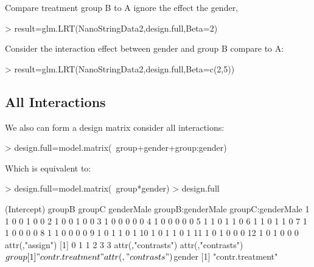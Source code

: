 \documentclass[12pt]{article}
\begin{document}
Compare treatment group B to A ignore the effect the gender, 
\begin{Schunk}
\begin{Sinput}
> result=glm.LRT(NanoStringData2,design.full,Beta=2)
\end{Sinput}
\end{Schunk}


Consider the interaction effect between gender and group B compare to A:
\begin{Schunk}
\begin{Sinput}
> result=glm.LRT(NanoStringData2,design.full,Beta=c(2,5))
\end{Sinput}
\end{Schunk}


\subsection{All Interactions}
We also can form a design matrix consider all interactions:
\begin{Schunk}
\begin{Sinput}
> design.full=model.matrix(~group+gender+group:gender)
\end{Sinput}
\end{Schunk}

Which is equivalent to:
\begin{Schunk}
\begin{Sinput}
> design.full=model.matrix(~group*gender)
> design.full
\end{Sinput}
\begin{Soutput}
   (Intercept) groupB groupC genderMale groupB:genderMale groupC:genderMale
1            1      0      0          1                 0                 0
2            1      0      0          1                 0                 0
3            1      0      0          0                 0                 0
4            1      0      0          0                 0                 0
5            1      1      0          1                 1                 0
6            1      1      0          1                 1                 0
7            1      1      0          0                 0                 0
8            1      1      0          0                 0                 0
9            1      0      1          1                 0                 1
10           1      0      1          1                 0                 1
11           1      0      1          0                 0                 0
12           1      0      1          0                 0                 0
attr(,"assign")
[1] 0 1 1 2 3 3
attr(,"contrasts")
attr(,"contrasts")$group
[1] "contr.treatment"

attr(,"contrasts")$gender
[1] "contr.treatment"
\end{Soutput}
\end{Schunk}
\end{document}
